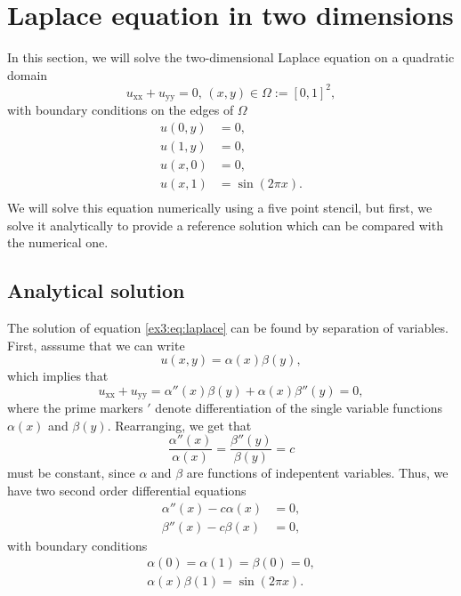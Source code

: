 \section{Laplace equation in two dimensions}
In this section, we will solve the two-dimensional Laplace equation on a quadratic domain
\begin{equation}
    u_\text{xx} + u_\text{yy} = 0, \, (x,y) \in \Omega := [0,1]^2,
    \label{ex3:eq:laplace}
\end{equation} with boundary conditions on the edges of $\Omega$
\begin{equation}
    \begin{split}
        u(0,y) &= 0,\\
        u(1,y) &= 0,\\
        u(x,0) &= 0,\\
        u(x,1) &= \sin(2\pi x).\\
    \end{split}
    \label{ex3:eq:boundary_conditions}
\end{equation}
We will solve this equation numerically using a five point stencil, but first, we solve it analytically to provide a reference solution which can be compared with the numerical one.

\subsection{Analytical solution}

The solution of equation \ref{ex3:eq:laplace} can be found by separation of variables.
First, asssume that we can write
\begin{equation*}
    u(x,y) = \alpha(x) \beta(y),
\end{equation*}
which implies that
\begin{equation*}
    u_\text{xx} + u_\text{yy} =  \alpha''(x) \beta(y) + \alpha(x) \beta''(y) = 0,
\end{equation*}
where the prime markers $'$ denote differentiation of the single variable functions $\alpha(x)$ and $\beta(y)$.
Rearranging, we get that
\begin{equation*}
    \frac{\alpha''(x)}{\alpha(x)} = \frac{\beta''(y)}{\beta(y)} = c
\end{equation*}
must be constant, since $\alpha$ and $\beta$ are functions of indepentent variables.
Thus, we have two second order differential equations
\begin{equation*}
    \begin{split}
        \alpha''(x) - c\alpha(x) &= 0, \\
        \beta''(x) - c\beta(x) &= 0,
    \end{split}
\end{equation*}
with boundary conditions
\begin{equation*}
    \begin{split}
    \alpha(0) = \alpha(1) = \beta(0) = 0,\\
    \alpha(x)\beta(1) = \sin(2\pi x).
    \end{split}
\end{equation*}

